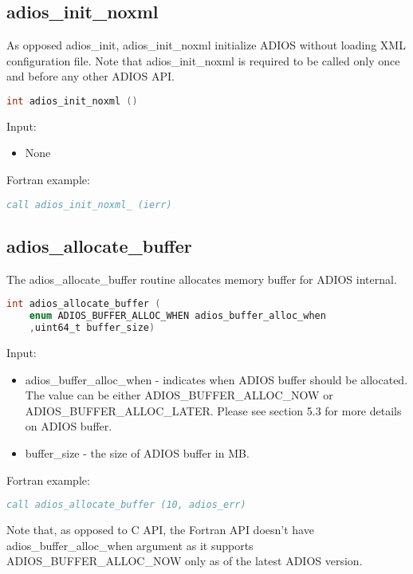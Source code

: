 \subsection{adios\_init\_noxml}

As opposed adios\_init, adios\_init\_noxml initialize ADIOS without loading XML 
configuration file. Note that adios\_init\_noxml is required to be called only 
once and before any other ADIOS API. 

\begin{lstlisting}[language=C,caption={},label={}]
int adios_init_noxml ()
\end{lstlisting}

Input: 
\begin{itemize}
\item None
\end{itemize}

Fortran example: 
\begin{lstlisting}[language=Fortran,caption={},label={}]
call adios_init_noxml_ (ierr)
\end{lstlisting}

\subsection{adios\_allocate\_buffer}

The adios\_allocate\_buffer routine allocates memory buffer for ADIOS internal. 
\begin{lstlisting}[language=C,caption={},label={}]
int adios_allocate_buffer (
	enum ADIOS_BUFFER_ALLOC_WHEN adios_buffer_alloc_when 
	,uint64_t buffer_size)
\end{lstlisting}

Input: 
\begin{itemize}
\item adios\_buffer\_alloc\_when - indicates when ADIOS buffer should be allocated. The value can be either {\small ADIOS\_BUFFER\_ALLOC\_NOW                          
   or ADIOS\_BUFFER\_ALLOC\_LATER.  }Please see section 5.3 for more details on ADIOS buffer.
\item buffer\_size - the size of ADIOS buffer in MB. 
\end{itemize}


Fortran example: 
\begin{lstlisting}[language=Fortran,caption={},label={}]
call adios_allocate_buffer (10, adios_err)
\end{lstlisting}

Note that, as opposed to C API, the Fortran API doesn't have adios\_buffer\_alloc\_when 
argument as it supports {\small ADIOS\_BUFFER\_ALLOC\_NOW }only as of the latest 
ADIOS version.\label{HToc182553358}

